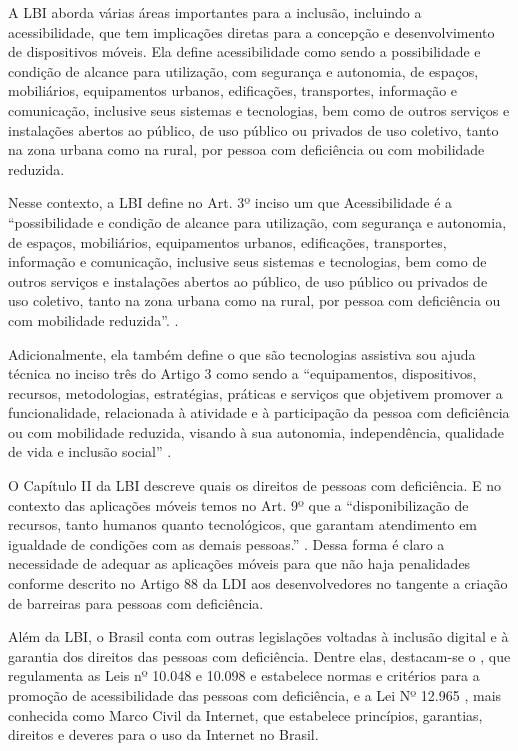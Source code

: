 A LBI aborda várias áreas importantes para a inclusão, incluindo a acessibilidade, que tem implicações diretas para a concepção e desenvolvimento de dispositivos móveis. Ela define acessibilidade como sendo a possibilidade e condição de alcance para utilização, com segurança e autonomia, de espaços, mobiliários, equipamentos urbanos, edificações, transportes, informação e comunicação, inclusive seus sistemas e tecnologias, bem como de outros serviços e instalações abertos ao público, de uso público ou privados de uso coletivo, tanto na zona urbana como na rural, por pessoa com deficiência ou com mobilidade reduzida.

Nesse contexto, a LBI define no Art. 3º inciso um que Acessibilidade é a “possibilidade e condição de alcance para utilização, com segurança e autonomia, de espaços, mobiliários, equipamentos urbanos, edificações, transportes, informação e comunicação, inclusive seus sistemas e tecnologias, bem como de outros serviços e instalações abertos ao público, de uso público ou privados de uso coletivo, tanto na zona urbana como na rural, por pessoa com deficiência ou com mobilidade reduzida”. \cite{lei13146}.

Adicionalmente, ela também define o que são tecnologias assistiva sou ajuda técnica no inciso três do Artigo 3 como sendo a “equipamentos, dispositivos, recursos, metodologias, estratégias, práticas e serviços que objetivem promover a funcionalidade, relacionada à atividade e à participação da pessoa com deficiência ou com mobilidade reduzida, visando à sua autonomia, independência, qualidade de vida e inclusão social” \cite{lei13146}.

O Capítulo II da LBI descreve quais os direitos de pessoas com deficiência. E no contexto das aplicações móveis temos no Art. 9º que a “disponibilização de recursos, tanto humanos quanto tecnológicos, que garantam atendimento em igualdade de condições com as demais pessoas.” \cite{lei13146}. Dessa forma é claro a necessidade de adequar as aplicações móveis para que não haja penalidades conforme descrito no Artigo 88 da LDI aos desenvolvedores no tangente a criação de barreiras para pessoas com deficiência.

Além da LBI, o Brasil conta com outras legislações voltadas à inclusão digital e à garantia dos direitos das pessoas com deficiência. Dentre elas, destacam-se o \cite{decreto5296}, que regulamenta as Leis nº 10.048 e 10.098 e estabelece normas e critérios para a promoção de acessibilidade das pessoas com deficiência, e a Lei Nº 12.965 \cite{lei12965}, mais conhecida como Marco Civil da Internet, que estabelece princípios, garantias, direitos e deveres para o uso da Internet no Brasil.

